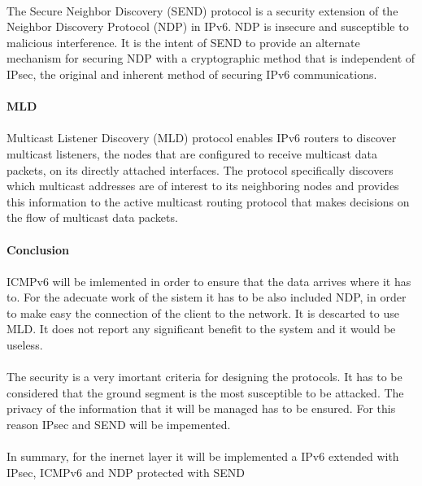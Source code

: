 \paragraph{}
The Secure Neighbor Discovery (SEND) protocol is a security extension of the Neighbor Discovery Protocol (NDP) in IPv6. NDP is insecure and susceptible to malicious interference. It is the intent of SEND to provide an alternate mechanism for securing NDP with a cryptographic method that is independent of IPsec, the original and inherent method of securing IPv6 communications.

\paragraph{} \textbf{MLD}
\paragraph{}
Multicast Listener Discovery (MLD) protocol enables IPv6 routers to discover multicast listeners, the nodes that are configured to receive multicast data packets, on its directly attached interfaces. The protocol specifically discovers which multicast addresses are of interest to its neighboring nodes and provides this information to the active multicast routing protocol that makes decisions on the flow of multicast data packets. 


\paragraph{} \textbf{Conclusion}
\paragraph{}
ICMPv6 will be imlemented in order to ensure that the data arrives where it has to. For the adecuate work of the sistem it has to be also included  NDP, in order to make easy the connection of the client to the network. It is descarted to use MLD. It does not report any significant benefit to the system and it would be useless.
\paragraph{}
The security is a very imortant criteria for designing the protocols. It has to be considered that the ground segment is the most susceptible to be attacked. The privacy of the information that it will be managed has to be ensured. For this reason IPsec and SEND will be impemented.
\paragraph{}
In summary, for the inernet layer it will be implemented a IPv6 extended with IPsec, ICMPv6 and NDP protected with SEND



